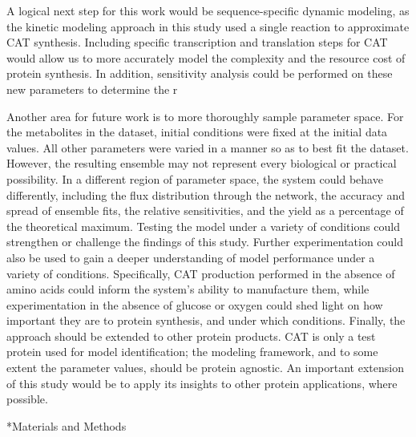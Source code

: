 \documentclass[12pt]{article}
\makeatletter
\renewcommand\section{\@startsection
	{subsection}{2}{0mm}
	{-0.2in}
	{0.05\baselineskip}
	{\normalfont\large\bfseries}}
\makeatother
\begin{document}

A logical next step for this work would be sequence-specific dynamic modeling, as the kinetic modeling approach in this study used a single reaction to approximate CAT synthesis.
Including specific transcription and translation steps for CAT would allow us to more accurately model the complexity and the resource cost of protein synthesis.
In addition, sensitivity analysis could be performed on these new parameters to determine the r

Another area for future work is to more thoroughly sample parameter space.
For the metabolites in the dataset, initial conditions were fixed at the initial data values.
All other parameters were varied in a manner so as to best fit the dataset.
However, the resulting ensemble may not represent every biological or practical possibility.
In a different region of parameter space, the system could behave differently, including the flux distribution through the network, the accuracy and spread of ensemble fits, the relative sensitivities, and the yield as a percentage of the theoretical maximum.
Testing the model under a variety of conditions could strengthen or challenge the findings of this study.
Further experimentation could also be used to gain a deeper understanding of model performance under a variety of conditions.
Specifically, CAT production performed in the absence of amino acids could inform the system's ability to manufacture them, while experimentation in the absence of glucose or oxygen could shed light on how important they are to protein synthesis, and under which conditions.
Finally, the approach should be extended to other protein products.
CAT is only a test protein used for model identification; the modeling framework, and to some extent the parameter values, should be protein agnostic.
An important extension of this study would be to apply its insights to other protein applications, where possible.

\clearpage

\section*{Materials and Methods}
\end{document}
